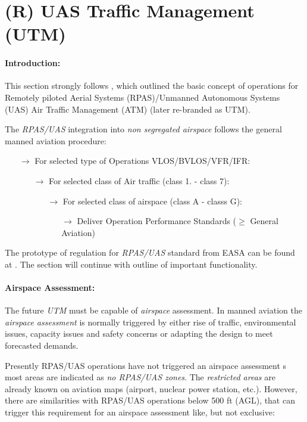 \section{(R) UAS Traffic Management (UTM)}\label{sec:UTM}
\paragraph{Introduction:} This section strongly follows \cite{eurocontrol2018rpasatm}, which outlined the basic concept of operations for Remotely piloted Aerial Systems (RPAS)/Unmanned Autonomous Systems (UAS) Air Traffic Management (ATM) (later re-branded as UTM).

The \emph{RPAS/UAS} integration into \emph{non segregated airspace} follows the general manned aviation procedure:
\begin{itemize}
    \item[$\to$] For selected type of Operations VLOS/BVLOS/VFR/IFR:
    \begin{itemize}
        \item[$\to$] For selected class of Air traffic (class 1. - class 7):
        \begin{itemize}
            \item[$\to$] For selected class of airspace (class A -  classs G):
            \begin{itemize}
                \item[$\to$] Deliver Operation Performance Standards ($\ge$ General Aviation)
            \end{itemize}
        \end{itemize}
    \end{itemize}
\end{itemize}

\noindent  The prototype of regulation for \emph{RPAS/UAS} standard from EASA can be found at \cite{easa2016rpasroperegul}. The section will continue with outline of important functionality.

\paragraph{Airspace Assessment:} The future \emph{UTM} must be capable of \emph{airspace} assessment. In manned aviation the \emph{airspace assessment} is normally triggered by either rise of traffic, environmental issues, capacity issues and safety concerns or adapting the design to meet forecasted demands.

Presently RPAS/UAS operations have not triggered an airspace assessment s most areas are indicated as \emph{no RPAS/UAS zones}. The \emph{restricted areas} are already known on aviation maps (airport, nuclear power station, etc.). However, there are similarities with RPAS/UAS operations below 500 ft (AGL), that can trigger this requirement for an airspace assessment like, but not exclusive:

